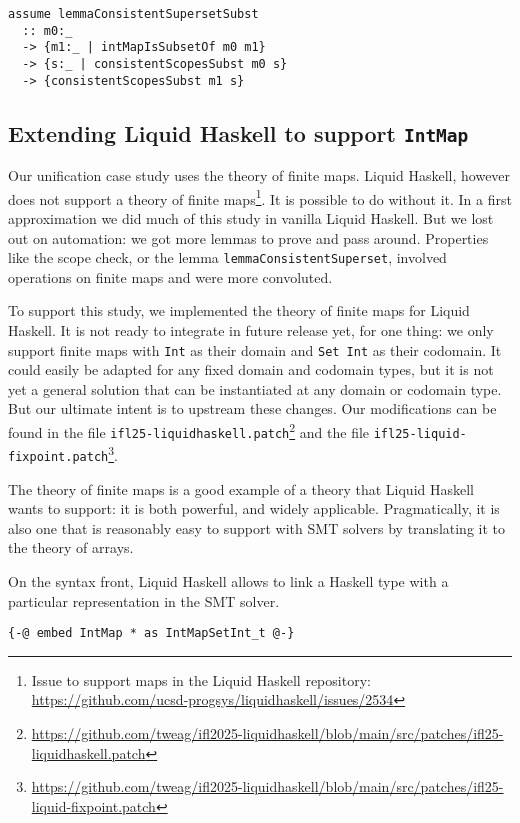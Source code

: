 \documentclass[sigconf]{acmart}
\newcommand{\tc}[1]{{\small\texttt{#1}}}
\newcommand{\patchfile}[1]{\tc{#1}\footnote{\scriptsize\url{https://github.com/tweag/ifl2025-liquidhaskell/blob/main/src/patches/#1}}}
\begin{document}
\begin{verbatim}
assume lemmaConsistentSupersetSubst
  :: m0:_
  -> {m1:_ | intMapIsSubsetOf m0 m1}
  -> {s:_ | consistentScopesSubst m0 s}
  -> {consistentScopesSubst m1 s}
\end{verbatim}

\subsection{Extending Liquid Haskell to support \tc{IntMap}}
\label{extending-liquid-haskell}

Our unification case study uses the theory of finite maps. Liquid Haskell,
however does not support a theory of finite maps\footnote{Issue to support maps in
  the Liquid Haskell repository:
  \url{https://github.com/ucsd-progsys/liquidhaskell/issues/2534}}. It is
possible to do without it. In a first approximation we did much of this study in
vanilla Liquid Haskell. But we lost out on automation: we got more lemmas to prove
and pass around. Properties like the scope check, or the lemma
\tc{lemmaConsistentSuperset}, involved operations on finite maps and were more
convoluted.

To support this study, we implemented the theory of finite maps for Liquid
Haskell. It is not ready to integrate in future release yet, for one thing: we only support finite
maps with \tc{Int} as their domain and \tc{Set Int} as their codomain. It could easily be adapted for any fixed
domain and codomain types, but it is not yet a general solution that can be instantiated at any
domain or codomain type. But our ultimate intent is to upstream these changes. Our
modifications can be found in the file \patchfile{ifl25-liquidhaskell.patch} and the file \patchfile{ifl25-liquid-fixpoint.patch}.

The theory of finite maps is a good example of a theory that Liquid Haskell wants
to support: it is both powerful, and widely applicable. Pragmatically, it is also
one that is reasonably easy to support with SMT solvers by translating it to
the theory of arrays.

On the syntax front, Liquid Haskell allows to link a Haskell type with a particular
representation in the SMT solver.

\begin{verbatim}
{-@ embed IntMap * as IntMapSetInt_t @-}
\end{verbatim}
\end{document}
